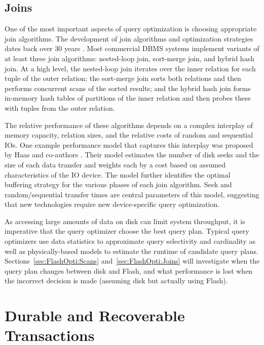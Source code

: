 \subsection{Joins}
\label{sec:Background:Joins}

One of the most important aspects of query optimization is choosing appropriate join algorithms.
The development of join algorithms and optimization strategies dates back over 30 years \cite{Selinger1979,Shapiro1986}. 
Most commercial DBMS systems implement variants of at least three join algorithms: nested-loop join, sort-merge join, and hybrid hash join.
At a high level, the nested-loop join iterates over the inner relation for each tuple of the outer relation; the sort-merge join sorts both relations and then performs concurrent scans of the sorted results; and the hybrid hash join forms in-memory hash tables of partitions of the inner relation and then probes these with tuples from the outer relation.

The relative performance of these algorithms depends on a complex interplay of memory capacity, relation sizes, and the relative costs of random and sequential IOs.  
One example performance model that captures this interplay was proposed by Haas and co-authors \cite{DBLP:journals/vldb/HaasCLS97}.
Their model estimates the number of disk seeks and the size of each data transfer and weights each by a cost based on assumed characteristics of the IO device.
The model further identifies the optimal buffering strategy for the various phases of each join algorithm.
Seek and random/sequential transfer times are central parameters of this model, suggesting that new technologies require new device-specific query optimization.

As accessing large amounts of data on disk can limit system throughput, it is imperative that the query optimizer choose the best query plan.
Typical query optimizers use data statistics to approximate query selectivity and cardinality as well as physically-based models to estimate the runtime of candidate query plans.
Sections~\ref{sec:FlashOpti:Scans} and~\ref{sec:FlashOpti:Joins} will investigate when the query plan changes between disk and Flash, and what performance is lost when the incorrect decision is made (assuming disk but actually using Flash).

\section{Durable and Recoverable Transactions}
\label{sec:Background:Recovery}

